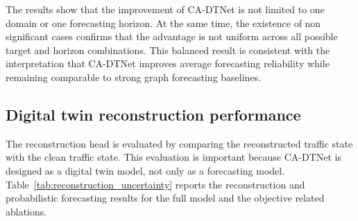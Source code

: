 \documentclass[pdflatex,sn-mathphys-num]{sn-jnl}%
\theoremstyle{thmstyleone}%
\theoremstyle{thmstyletwo}%
\theoremstyle{thmstylethree}%
\begin{document}
The results show that the improvement of CA-DTNet is not limited to one domain or one forecasting horizon. At the same time, the existence of non significant cases confirms that the advantage is not uniform across all possible target and horizon combinations. This balanced result is consistent with the interpretation that CA-DTNet improves average forecasting reliability while remaining comparable to strong graph forecasting baselines.

\subsection{Digital twin reconstruction performance}
\label{subsec:reconstruction_performance}

The reconstruction head is evaluated by comparing the reconstructed traffic state with the clean traffic state. This evaluation is important because CA-DTNet is designed as a digital twin model, not only as a forecasting model. Table~\ref{tab:reconstruction_uncertainty} reports the reconstruction and probabilistic forecasting results for the full model and the objective related ablations.
\end{document}
